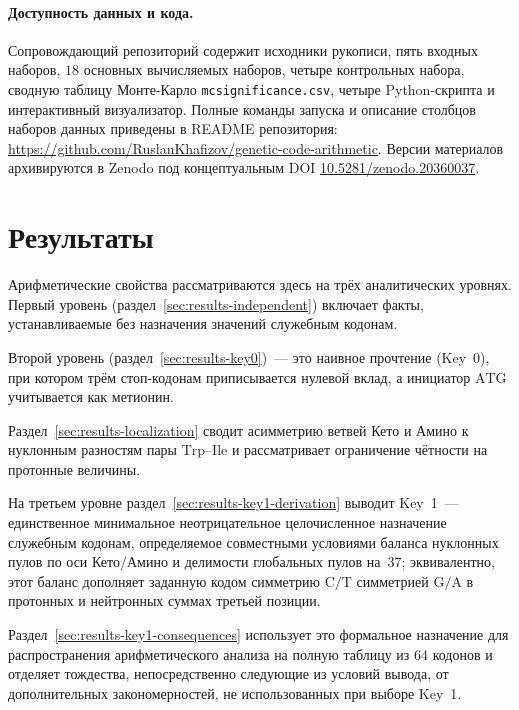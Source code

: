 \documentclass[11pt,a4paper]{article}
\renewcommand{\_}{\origunderscore\allowbreak}
\begin{document}
\paragraph{Доступность данных и кода.}
Сопровождающий репозиторий содержит исходники рукописи, пять входных
наборов, $18$ основных вычисляемых наборов, четыре контрольных
набора, сводную таблицу Монте-Карло
\texttt{mc\_significance.csv}, четыре Python-скрипта и интерактивный
визуализатор. Полные команды запуска и описание столбцов наборов данных
приведены в README репозитория:
\url{https://github.com/RuslanKhafizov/genetic-code-arithmetic}.
Версии материалов архивируются в Zenodo под концептуальным DOI
\href{https://doi.org/10.5281/zenodo.20360037}
     {10.5281/zenodo.20360037}.

\endgroup

\section{Результаты}
\label{sec:results}

Арифметические свойства рассматриваются здесь на трёх аналитических
уровнях. Первый уровень (раздел~\ref{sec:results-independent}) включает
факты, устанавливаемые без назначения значений служебным кодонам.

Второй уровень (раздел~\ref{sec:results-key0})~--- это наивное
прочтение (Key~0), при котором трём стоп-кодонам приписывается нулевой
вклад, а инициатор $\mathrm{ATG}$ учитывается как метионин.

Раздел~\ref{sec:results-localization} сводит асимметрию ветвей Кето и
Амино к нуклонным разностям пары $\mathrm{Trp}$--$\mathrm{Ile}$ и
рассматривает ограничение чётности на протонные величины.

На третьем уровне раздел~\ref{sec:results-key1-derivation}
выводит Key~1~--- единственное минимальное неотрицательное
целочисленное назначение служебным кодонам, определяемое совместными
условиями баланса нуклонных пулов по оси Кето/Амино и делимости
глобальных пулов на~$37$; эквивалентно, этот баланс дополняет заданную
кодом симметрию $\mathrm{C}/\mathrm{T}$ симметрией
$\mathrm{G}/\mathrm{A}$ в протонных и нейтронных суммах третьей
позиции.

Раздел~\ref{sec:results-key1-consequences} использует это формальное
назначение для распространения арифметического анализа на полную
таблицу из $64$ кодонов и отделяет тождества, непосредственно следующие
из условий вывода, от дополнительных закономерностей, не
использованных при выборе Key~1.
\end{document}
